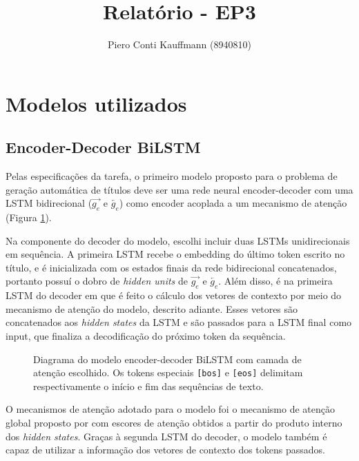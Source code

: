 \documentclass{article}
\title{Relatório - EP3}
\author{Piero Conti Kauffmann (8940810)}
\date{}
\begin{document}
\maketitle

\section{Modelos utilizados}

\subsection{Encoder-Decoder BiLSTM}

Pelas especificações da tarefa, o primeiro modelo proposto para o problema de geração automática de títulos  deve ser uma rede neural encoder-decoder com uma LSTM bidirecional ($\overrightarrow{g_{e}}$ e $\overleftarrow{g_{e}}$) como encoder acoplada a um mecanismo de atenção (Figura \ref{lstm_fig}). 

Na componente do decoder do modelo, escolhi incluir duas LSTMs unidirecionais em sequência. A primeira LSTM recebe o embedding do último token escrito no título, e é inicializada com os estados finais da rede bidirecional concatenados, portanto possuí o dobro de \textit{hidden units} de $\overrightarrow{g_{e}}$ e $\overleftarrow{g_{e}}$. Além disso, é na primeira LSTM do decoder em que é feito o cálculo dos vetores de contexto por meio do mecanismo de atenção do modelo, descrito adiante. Esses vetores são concatenados aos \textit{hidden states} da LSTM e são passados para a LSTM final como input, que finaliza a decodificação do próximo token da sequência.

\vspace{2em}

\begin{figure}[h]
\centering

\caption{Diagrama do modelo encoder-decoder BiLSTM com camada de atenção escolhido. Os tokens especiais \texttt{[bos]} e \texttt{[eos]} delimitam respectivamente o início e fim das sequências de texto.}
\label{lstm_fig}
\end{figure}

O mecanismos de atenção adotado para o modelo foi o mecanismo de atenção global proposto por \textcite{luong2015effective} com escores de atenção obtidos a partir do produto interno dos \textit{hidden states}. Graças à segunda LSTM do decoder, o modelo também é capaz de utilizar a informação dos vetores de contexto dos tokens passados.
\end{document}
